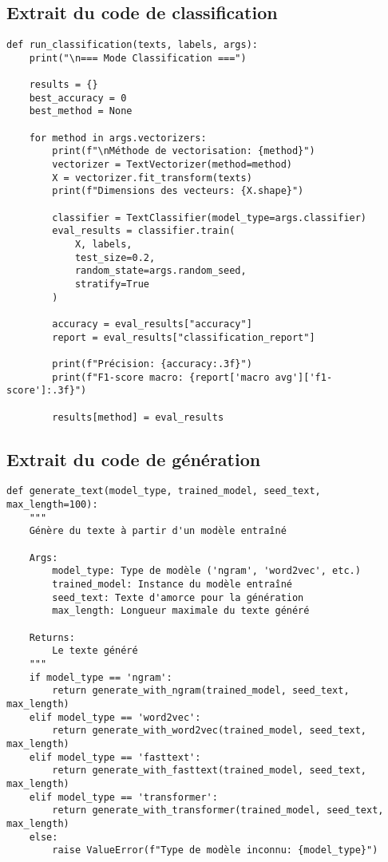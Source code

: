\documentclass[a4paper,11pt]{article}
\begin{document}
\subsection{Extrait du code de classification}
\begin{lstlisting}[caption=Implémentation du classificateur]
def run_classification(texts, labels, args):
    print("\n=== Mode Classification ===")
    
    results = {}
    best_accuracy = 0
    best_method = None
    
    for method in args.vectorizers:
        print(f"\nMéthode de vectorisation: {method}")
        vectorizer = TextVectorizer(method=method)
        X = vectorizer.fit_transform(texts)
        print(f"Dimensions des vecteurs: {X.shape}")
        
        classifier = TextClassifier(model_type=args.classifier)
        eval_results = classifier.train(
            X, labels, 
            test_size=0.2, 
            random_state=args.random_seed, 
            stratify=True
        )
        
        accuracy = eval_results["accuracy"]
        report = eval_results["classification_report"]
        
        print(f"Précision: {accuracy:.3f}")
        print(f"F1-score macro: {report['macro avg']['f1-score']:.3f}")
        
        results[method] = eval_results
\end{lstlisting}

\subsection{Extrait du code de génération}
\begin{lstlisting}[caption=Implémentation du générateur de texte]
def generate_text(model_type, trained_model, seed_text, max_length=100):
    """
    Génère du texte à partir d'un modèle entraîné
    
    Args:
        model_type: Type de modèle ('ngram', 'word2vec', etc.)
        trained_model: Instance du modèle entraîné
        seed_text: Texte d'amorce pour la génération
        max_length: Longueur maximale du texte généré
    
    Returns:
        Le texte généré
    """
    if model_type == 'ngram':
        return generate_with_ngram(trained_model, seed_text, max_length)
    elif model_type == 'word2vec':
        return generate_with_word2vec(trained_model, seed_text, max_length)
    elif model_type == 'fasttext':
        return generate_with_fasttext(trained_model, seed_text, max_length)
    elif model_type == 'transformer':
        return generate_with_transformer(trained_model, seed_text, max_length)
    else:
        raise ValueError(f"Type de modèle inconnu: {model_type}")
\end{lstlisting}
\end{document}
